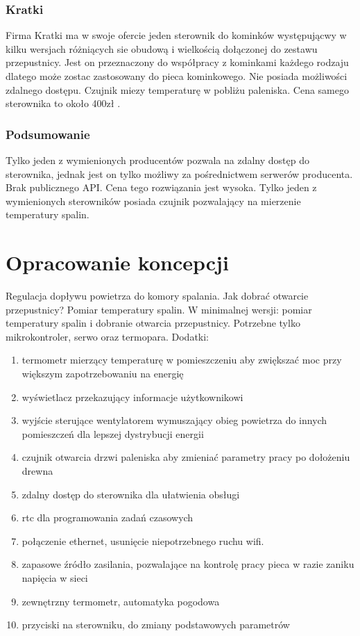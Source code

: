 \documentclass[12pt]{report}
\begin{document}
 \subsection{Kratki}
 Firma Kratki ma w swoje ofercie \cite{Kratki} jeden sterownik do kominków występującwy w kilku wersjach różniących sie obudową i wielkością dołączonej do zestawu przepustnicy.
 Jest on przeznaczony do współpracy z kominkami każdego rodzaju dlatego może zostac zastosowany do pieca kominkowego. Nie posiada możliwości zdalnego dostępu. Czujnik miezy temperaturę w pobliżu paleniska. 
 Cena samego sterownika to około 400zł \cite{KratkiSterownik}.
  \subsection{Podsumowanie}
  Tylko jeden z wymienionych producentów pozwala na zdalny dostęp do sterownika, jednak jest on tylko możliwy za pośrednictwem serwerów producenta. Brak publicznego API. Cena tego rozwiązania jest wysoka.
  Tylko jeden z wymienionych sterowników posiada czujnik pozwalający na mierzenie temperatury spalin.
  
  
 \chapter{Opracowanie koncepcji}
 Regulacja dopływu powietrza do komory spalania. Jak dobrać otwarcie przepustnicy? Pomiar temperatury spalin.
 W minimalnej wersji: pomiar temperatury spalin i dobranie otwarcia przepustnicy. Potrzebne tylko mikrokontroler, serwo oraz termopara.
 Dodatki:
 \begin{enumerate}
 \item termometr mierzący temperaturę w pomieszczeniu aby zwiększać moc przy większym zapotrzebowaniu na energię
 \item wyświetlacz przekazujący informacje użytkownikowi
 \item wyjście sterujące wentylatorem wymuszający obieg powietrza do innych pomieszczeń dla lepszej dystrybucji energii
 \item czujnik otwarcia drzwi paleniska aby zmieniać parametry pracy po dołożeniu drewna
 \item zdalny dostęp do sterownika dla ułatwienia obsługi
 \item rtc dla programowania zadań czasowych
 \item połączenie ethernet, usunięcie niepotrzebnego ruchu wifi.
 \item zapasowe źródło zasilania, pozwalające na kontrolę pracy pieca w razie zaniku napięcia w sieci
 \item zewnętrzny termometr, automatyka pogodowa
 \item przyciski na sterowniku, do zmiany podstawowych parametrów
 \end{enumerate}  
 
\end{document}
